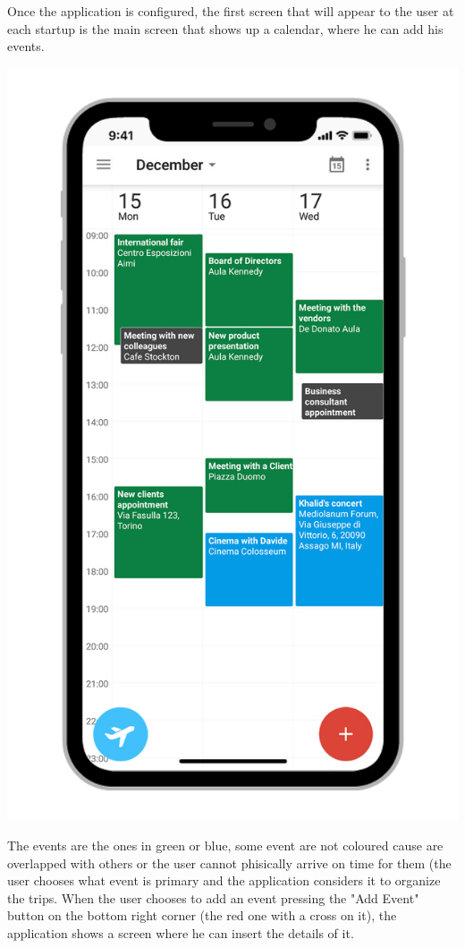 Once the application is configured, the first screen that will appear to the user at each startup is the main screen that shows up a calendar, where he can add his events.
\begin{center}
\includegraphics[scale=1.2]{MainMatter/images/ui/calendar}
\end{center}
The events are the ones in green or blue, some event are not coloured cause are overlapped with others or the user cannot phisically arrive on time for them (the user chooses what event is primary and the application considers it to organize the trips. When the user chooses to add an event pressing the "Add Event" button on the bottom right corner (the red one with a cross on it), the application shows a screen where he can insert the details of it.
